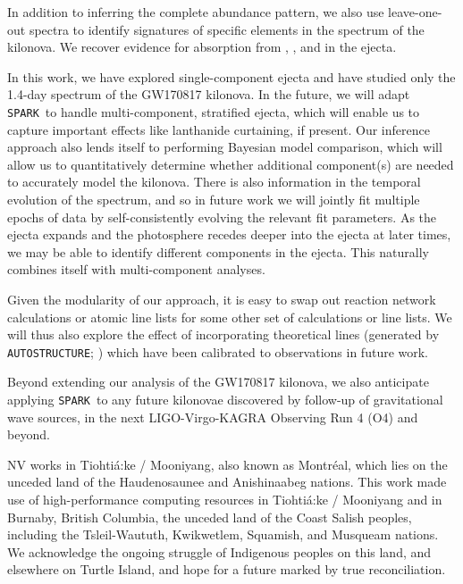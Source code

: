 \documentclass[twocolumn, twocolappendix]{aastex63}
\def\SPARK{\texttt{SPARK}}
\def\AUTOSTRUCTURE{\texttt{AUTOSTRUCTURE}}
\begin{document}
In addition to inferring the complete abundance pattern, we also use leave-one-out spectra to identify signatures of specific elements in the spectrum of the kilonova. We recover evidence for absorption from , , and  in the ejecta. 

In this work, we have explored single-component ejecta and have studied only the 1.4-day spectrum of the GW170817 kilonova. In the future, we will adapt \SPARK~to handle multi-component, stratified ejecta, which will enable us to capture important effects like lanthanide curtaining, if present. Our inference approach also lends itself to performing Bayesian model comparison, which will allow us to quantitatively determine whether additional component(s) are needed to accurately model the kilonova. There is also information in the temporal evolution of the spectrum, and so in future work we will jointly fit multiple epochs of data by self-consistently evolving the relevant fit parameters. As the ejecta expands and the photosphere recedes deeper into the ejecta at later times, we may be able to identify different components in the ejecta. This naturally combines itself with multi-component analyses.

Given the modularity of our approach, it is easy to swap out reaction network calculations or atomic line lists for some other set of calculations or line lists. We will thus also explore the effect of incorporating theoretical lines (generated by \AUTOSTRUCTURE; \citealt{badnell16}) which have been calibrated to observations in future work. 

Beyond extending our analysis of the GW170817 kilonova, we also anticipate applying \SPARK~to any future kilonovae discovered by follow-up of gravitational wave sources, in the next LIGO-Virgo-KAGRA Observing Run 4 (O4) and beyond.



\acknowledgments


NV works in Tiohti{\'a}:ke / Mooniyang, also known as Montr{\'e}al, which lies on the unceded land of the Haudenosaunee and Anishinaabeg nations. This work made use of high-performance computing resources in Tiohti{\'a}:ke / Mooniyang and in Burnaby, British Columbia, the unceded land of the Coast Salish peoples, including the Tsleil-Waututh, Kwikwetlem, Squamish, and Musqueam nations. We acknowledge the ongoing struggle of Indigenous peoples on this land, and elsewhere on Turtle Island, and hope for a future marked by true reconciliation. 
\end{document}
